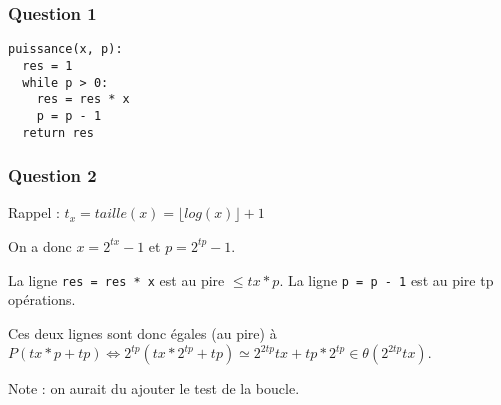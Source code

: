 \hypertarget{question-1-1}{%
\subsubsection{Question 1}\label{question-1-1}}

\begin{verbatim}
puissance(x, p):
  res = 1
  while p > 0:
    res = res * x
    p = p - 1
  return res
\end{verbatim}

\hypertarget{question-2-1}{%
\subsubsection{Question 2}\label{question-2-1}}

Rappel : \(t_x = taille(x) = \lfloor log(x) \rfloor + 1\)

On a donc \(x = 2^{tx}-1\) et \(p=2^{tp}-1\).

La ligne \texttt{res\ =\ res\ *\ x} est au pire \(\leqslant tx * p\). La
ligne \texttt{p\ =\ p\ -\ 1} est au pire tp opérations.

Ces deux lignes sont donc égales (au pire) à
\(P(tx*p+tp) \iff 2^{tp}(tx*2^{tp}+tp) \simeq 2^{2tp}tx+tp*2^{tp} \in \theta(2^{2tp}tx)\).

Note : on aurait du ajouter le test de la boucle.
